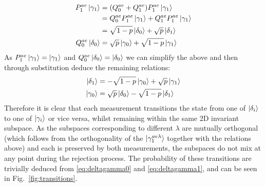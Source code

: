 \documentclass[aps,floatfix,10pt,amssymb,amsfont,amsmath,superscriptaddress,float,nofootinbib,longbibliography,nobalancelastpage,twocolumn]{revtex4-2}
\begin{document}
\begin{align}
\begin{split}
\label{eq:deltagamma0}
    P^{ae}_1 \ket{\gamma_1} &= (Q^{ae}_0+Q^{ae}_1)P^{ae}_1 \ket{\gamma_1}\\
    &= Q^{ae}_0P^{ae}_1 \ket{\gamma_1}+Q^{ae}_1P^{ae}_1 \ket{\gamma_1}\\
    &= \sqrt{1-p} \ket{\delta_0} + \sqrt{p}\ket{\delta_1}\\
    Q^{ae}_0\ket{\delta_0} &= \sqrt{p} \ket{\gamma_0} + \sqrt{1-p} \ket{\gamma_1}
\end{split}
\end{align}
As $P^{ae}_1 \ket{\gamma_1} = \ket{\gamma_1}$ and $Q^{ae}_0\ket{\delta_0} = \ket{\delta_0}$ we can simplify the above and then through substitution deduce the remaining relations:
\begin{align}
\begin{split}
\label{eq:deltagamma1}
        \ket{\delta_1} &= -\sqrt{1-p} \ket{\gamma_0} + \sqrt{p} \ket{\gamma_1}\\
    \ket{\gamma_0} &= \sqrt{p} \ket{\delta_0} - \sqrt{1-p}\ket{\delta_1}
\end{split}
\end{align}
Therefore it is clear that each measurement transitions the state from one of $\ket{\delta_i}$ to one of $\ket{\gamma_i}$ or vice versa, whilst remaining within the same 2D invariant subspace. As the subspaces corresponding to different $\lambda$ are mutually orthogonal (which follows from the orthogonality of the $\ket{\gamma^{ae\lambda}_1}$ together with the relations above) and each is preserved by both measurements, the subspaces do not mix at any point during the rejection process. The probability of these transitions are trivially deduced from \eqref{eq:deltagamma0} and \eqref{eq:deltagamma1}, and can be seen in Fig.~\ref{fig:transitions}.
\end{document}
